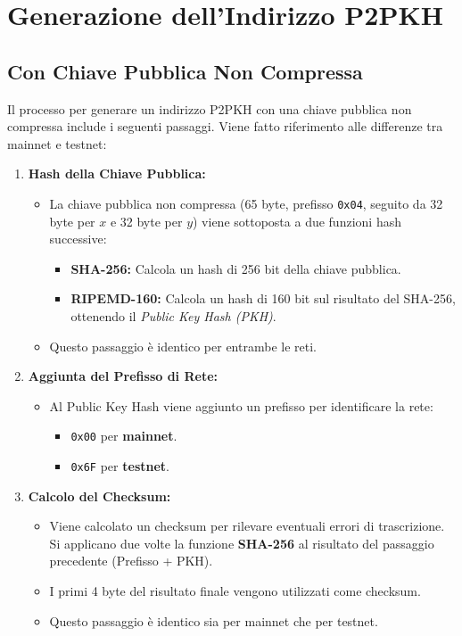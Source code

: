 \documentclass[a4paper,12pt]{article}
\begin{document}
\section{Generazione dell'Indirizzo P2PKH}

\subsection{Con Chiave Pubblica Non Compressa}
Il processo per generare un indirizzo P2PKH con una chiave pubblica non compressa include i seguenti passaggi. Viene fatto riferimento alle differenze tra mainnet e testnet:

\begin{enumerate}
    \item \textbf{Hash della Chiave Pubblica:}
    \begin{itemize}
        \item La chiave pubblica non compressa (65 byte, prefisso \texttt{0x04}, seguito da 32 byte per \(x\) e 32 byte per \(y\)) viene sottoposta a due funzioni hash successive:
        \begin{itemize}
            \item \textbf{SHA-256:} Calcola un hash di 256 bit della chiave pubblica.
            \item \textbf{RIPEMD-160:} Calcola un hash di 160 bit sul risultato del SHA-256, ottenendo il \textit{Public Key Hash (PKH)}.
        \end{itemize}
        \item Questo passaggio è identico per entrambe le reti.
    \end{itemize}

    \item \textbf{Aggiunta del Prefisso di Rete:}
    \begin{itemize}
        \item Al Public Key Hash viene aggiunto un prefisso per identificare la rete:
        \begin{itemize}
            \item \texttt{0x00} per \textbf{mainnet}.
            \item \texttt{0x6F} per \textbf{testnet}.
        \end{itemize}
    \end{itemize}

    \item \textbf{Calcolo del Checksum:}
    \begin{itemize}
        \item Viene calcolato un checksum per rilevare eventuali errori di trascrizione. Si applicano due volte la funzione \textbf{SHA-256} al risultato del passaggio precedente (Prefisso + PKH).
        \item I primi 4 byte del risultato finale vengono utilizzati come checksum.
        \item Questo passaggio è identico sia per mainnet che per testnet.
    \end{itemize}


\end{enumerate}
\end{document}
